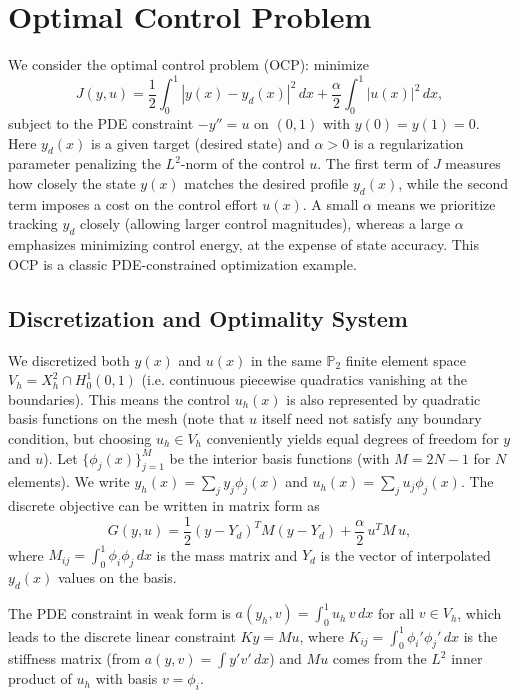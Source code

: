 \section{Optimal Control Problem}
\label{sec:optimal_control}
We consider the optimal control problem (OCP): minimize
\[
	J(y,u) = \frac{1}{2}\int_0^1 |y(x)-y_d(x)|^2\,dx + \frac{\alpha}{2}\int_0^1 |u(x)|^2\,dx,
\]
subject to the PDE constraint $-y'' = u$ on $(0,1)$ with $y(0)=y(1)=0$. Here $y_d(x)$ is a given target (desired state) and $\alpha>0$ is a regularization parameter penalizing the $L^2$-norm of the control $u$. The first term of $J$ measures how closely the state $y(x)$ matches the desired profile $y_d(x)$, while the second term imposes a cost on the control effort $u(x)$. A small $\alpha$ means we prioritize tracking $y_d$ closely (allowing larger control magnitudes), whereas a large $\alpha$ emphasizes minimizing control energy, at the expense of state accuracy. This OCP is a classic PDE-constrained optimization example.

\subsection{Discretization and Optimality System}

We discretized both $y(x)$ and $u(x)$ in the same $\mathbb{P}_2$ finite element space $V_h = X_h^2 \cap H_0^1(0,1)$ (i.e. continuous piecewise quadratics vanishing at the boundaries). This means the control $u_h(x)$ is also represented by quadratic basis functions on the mesh (note that $u$ itself need not satisfy any boundary condition, but choosing $u_h\in V_h$ conveniently yields equal degrees of freedom for $y$ and $u$). Let $\{\phi_j(x)\}_{j=1}^{M}$ be the interior basis functions (with $M=2N-1$ for $N$ elements). We write $y_h(x)=\sum_j y_j\phi_j(x)$ and $u_h(x)=\sum_j u_j\phi_j(x)$. The discrete objective can be written in matrix form as
\[
	G(y,u) = \frac{1}{2}(y-Y_d)^T M(y-Y_d) + \frac{\alpha}{2}\,u^T M\,u,
\]
where $M_{ij}=\int_0^1 \phi_i\phi_j\,dx$ is the mass matrix and $Y_d$ is the vector of interpolated $y_d(x)$ values on the basis.

The PDE constraint in weak form is $a(y_h,v) = \int_0^1 u_h\,v\,dx$ for all $v\in V_h$, which leads to the discrete linear constraint $Ky = Mu$, where $K_{ij}=\int_0^1 \phi_i'\phi_j'\,dx$ is the stiffness matrix (from $a(y,v)=\int y'v'\,dx$) and $Mu$ comes from the $L^2$ inner product of $u_h$ with basis $v=\phi_i$.


